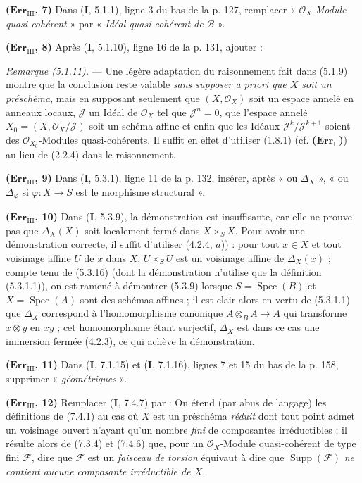 \noindent\textbf{($\mathbf{Err}_{\mathrm{III}}$, 7)} Dans (\textbf{I}, 5.1.1), ligne 3
du bas de la p. 127, remplacer « $\mathscr O_X$-\emph{Module quasi-cohérent} » par
« \emph{Idéal quasi-cohérent de} $\mathscr B$ ».

\noindent\textbf{($\mathbf{Err}_{\mathrm{III}}$, 8)} Après (\textbf{I}, 5.1.10),
ligne 16 de la p. 131, ajouter :

\emph{Remarque (5.1.11).} --- Une légère adaptation du raisonnement fait dans
(5.1.9) montre que la conclusion reste valable \emph{sans supposer a priori
que $X$ soit un préschéma}, mais
en supposant seulement que $(X,\mathscr O_X)$ soit un espace annelé en anneaux
locaux, $\mathscr J$ un Idéal de $\mathscr O_X$ tel que $\mathscr J^n=0$, que
l'espace annelé $X_0=(X,\mathscr O_X/\mathscr J)$ soit un schéma affine et enfin
que les Idéaux $\mathscr J^k/\mathscr J^{k+1}$ soient des
$\mathscr O_{X_0}$-Modules quasi-cohérents. Il suffit en effet d'utiliser
(1.8.1) (cf. \textbf{($\mathbf{Err}_{\mathrm{II}}$)}) au lieu de (2.2.4) dans le
raisonnement.

\noindent\textbf{($\mathbf{Err}_{\mathrm{III}}$, 9)} Dans (\textbf{I}, 5.3.1), ligne
11 de la p. 132, insérer, après « ou $\Delta_X$ », « ou $\Delta_\varphi$ si
$\varphi:X\to S$ est le morphisme structural ».

\noindent\textbf{($\mathbf{Err}_{\mathrm{III}}$, 10)} Dans (\textbf{I}, 5.3.9), la
démonstration est insuffisante, car elle ne prouve pas que $\Delta_X(X)$ soit
localement fermé dans $X\times_SX$. Pour avoir une démonstration correcte, il
suffit d'utiliser (4.2.4, $a$)) : pour tout $x\in X$ et tout voisinage affine
$U$ de $x$ dans $X$, $U\times_SU$ est un voisinage affine de $\Delta_X(x)$ ;
compte tenu de (5.3.16) (dont la démonstration n'utilise que la définition
(5.3.1.1)), on est ramené à démontrer (5.3.9) lorsque
$S=\operatorname{Spec}(B)$ et $X=\operatorname{Spec}(A)$ sont des schémas
affines ; il est clair alors en vertu de (5.3.1.1) que $\Delta_X$ correspond à
l'homomorphisme canonique $A\otimes_BA\to A$ qui transforme $x\otimes y$ en
$xy$ ; cet homomorphisme étant surjectif, $\Delta_X$ est dans ce cas une
immersion fermée (4.2.3), ce qui achève la démonstration.

\noindent\textbf{($\mathbf{Err}_{\mathrm{III}}$, 11)} Dans (\textbf{I}, 7.1.15) et
(\textbf{I}, 7.1.16), lignes 7 et 15 du bas de la p. 158, supprimer
« \emph{géométriques} ».

\noindent\textbf{($\mathbf{Err}_{\mathrm{III}}$, 12)} Remplacer (\textbf{I}, 7.4.7)
par : On étend (par abus de langage) les définitions de (7.4.1) au cas où
$X$ est un préschéma \emph{réduit} dont tout point admet un voisinage ouvert
n'ayant qu'un nombre \emph{fini} de composantes irréductibles ; il résulte
alors de (7.3.4) et (7.4.6) que, pour un $\mathscr O_X$-Module quasi-cohérent de
type fini $\mathscr F$, dire que $\mathscr F$ est un \emph{faisceau de torsion}
équivaut à dire que $\operatorname{Supp}(\mathscr F)$ \emph{ne contient aucune
composante irréductible de $X$}.

